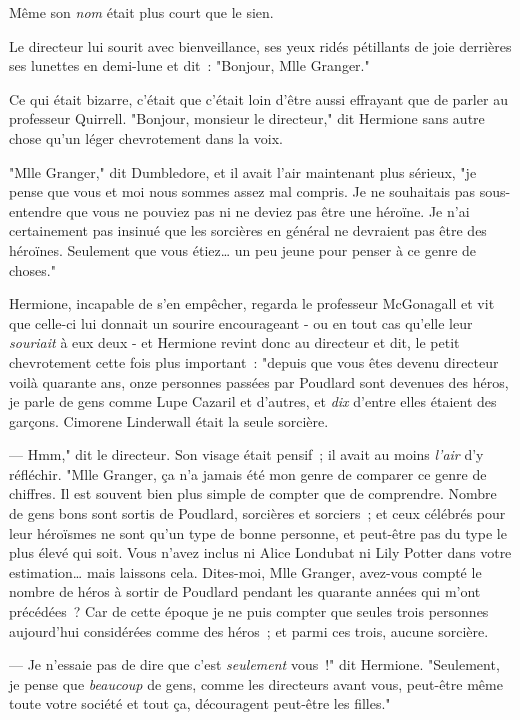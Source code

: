 Même son \emph{nom} était plus court que le sien.

Le directeur lui sourit avec bienveillance, ses yeux ridés pétillants de joie derrières ses lunettes en demi-lune et dit~: "Bonjour, Mlle Granger."

Ce qui était bizarre, c'était que c'était loin d'être aussi effrayant que de parler au professeur Quirrell. "Bonjour, monsieur le directeur," dit Hermione sans autre chose qu'un léger chevrotement dans la voix.

"Mlle Granger," dit Dumbledore, et il avait l'air maintenant plus sérieux, "je pense que vous et moi nous sommes assez mal compris. Je ne souhaitais pas sous-entendre que vous ne pouviez pas ni ne deviez pas être une héroïne. Je n'ai certainement pas insinué que les sorcières en général ne devraient pas être des héroïnes. Seulement que vous étiez… un peu jeune pour penser à ce genre de choses."

Hermione, incapable de s'en empêcher, regarda le professeur McGonagall et vit que celle-ci lui donnait un sourire encourageant - ou en tout cas qu'elle leur \emph{souriait} à eux deux - et Hermione revint donc au directeur et dit, le petit chevrotement cette fois plus important~: "depuis que vous êtes devenu directeur voilà quarante ans, onze personnes passées par Poudlard sont devenues des héros, je parle de gens comme Lupe Cazaril et d'autres, et \emph{dix} d'entre elles étaient des garçons. Cimorene Linderwall était la seule sorcière.

--- Hmm," dit le directeur. Son visage était pensif~; il avait au moins \emph{l'air} d'y réfléchir. "Mlle Granger, ça n'a jamais été mon genre de comparer ce genre de chiffres. Il est souvent bien plus simple de compter que de comprendre. Nombre de gens bons sont sortis de Poudlard, sorcières et sorciers~; et ceux célébrés pour leur héroïsmes ne sont qu'un type de bonne personne, et peut-être pas du type le plus élevé qui soit. Vous n'avez inclus ni Alice Londubat ni Lily Potter dans votre estimation… mais laissons cela. Dites-moi, Mlle Granger, avez-vous compté le nombre de héros à sortir de Poudlard pendant les quarante années qui m'ont précédées~? Car de cette époque je ne puis compter que seules trois personnes aujourd'hui considérées comme des héros~; et parmi ces trois, aucune sorcière.

--- Je n'essaie pas de dire que c'est \emph{seulement} vous~!" dit Hermione. "Seulement, je pense que \emph{beaucoup} de gens, comme les directeurs avant vous, peut-être même toute votre société et tout ça, découragent peut-être les filles."

